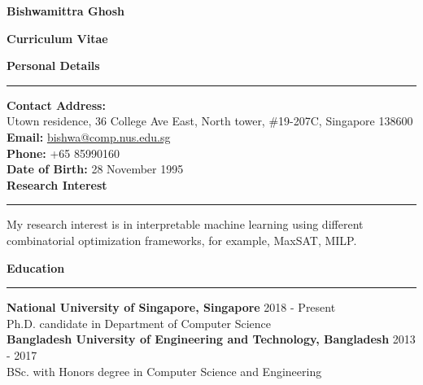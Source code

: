 \documentclass[a4paper,11pt,final]{article}
\newcommand{\Sep}{\vspace{1.5em}}
\newcommand{\SmallSep}{\vspace{0.5em}}
\begin{document}
	
	\begin{center}
		\Huge \textbf{Bishwamittra Ghosh}\\
		\vspace{0.2em}	
		\Large \centerline{ \textbf{Curriculum Vitae}}
	\end{center}
	
	\Sep
	\Large { \textbf{Personal Details}}\\
	\noindent\rule{\textwidth}{1pt}
	\normalsize 
	 \textbf{Contact Address:} \\Utown residence, 36 College Ave East, 	 North tower, $ \# $19-207C, Singapore 138600\\
	\textbf{Email:} \url{bishwa@comp.nus.edu.sg}  \\
	\textbf{Phone:} +65 85990160\\
	\textbf{Date of Birth:}  28  November  1995 \\

	\Sep	
\Large { \textbf{Research Interest}}\\
\noindent\rule{\textwidth}{1pt}
\normalsize
My research interest is in interpretable machine learning using different combinatorial optimization frameworks, for example, MaxSAT, MILP. 
	
	\Sep	
\Large { \textbf{Education}}\\
\noindent\rule{\textwidth}{1pt}
\normalsize
\textbf{National University of Singapore, Singapore}
\hspace*{\fill} 2018  - Present\\
Ph.D. candidate in Department of Computer Science\\

\SmallSep
\textbf{Bangladesh University of Engineering and Technology, Bangladesh}
\hspace*{\fill} 2013  -  2017\\
BSc. with Honors degree in Computer Science and Engineering\\
\end{document}
